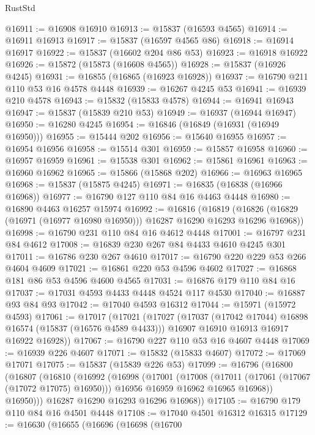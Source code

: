 \begin{lexlean}{RustStd}
\begin{coremodule}
{\begin{coremodule}
{{{{{{{{{{{{{{{{{{{{{{{{{{{{{{{{{{{{{{{{{{{{{{{{{{{{{{{{{{{{@16911 := @16908 @16910
@16913 := @15837 (@16593 @4565)
@16914 := @16911 @16913
@16917 := @15837 (@16597 @4565 @86)
@16918 := @16914 @16917
@16922 := @15837 (@16602 @204 @86 @53)
@16923 := @16918 @16922
@16926 := @15872 (@15873 (@16608 @4565))
@16928 := @15837 (@16926 @4245)
@16931 := @16855 (@16865 (@16923 @16928))
@16937 := @16790 @211 @110 @53 @16 @4578 @4448
@16939 := @16267 @4245 @53
@16941 := @16939 @210 @4578
@16943 := @15832 (@15833 @4578)
@16944 := @16941 @16943
@16947 := @15837 (@15839 @210 @53)
@16949 := @16937 (@16944 @16947)
@16950 := @16280 @4245
@16954 := @16846 (@16849 (@16931 (@16949 @16950)))
@16955 := @15444 @202
@16956 := @15640 @16955
@16957 := @16954 @16956
@16958 := @15514 @301
@16959 := @15857 @16958
@16960 := @16957 @16959
@16961 := @15538 @301
@16962 := @15861 @16961
@16963 := @16960 @16962
@16965 := @15866 (@15868 @202)
@16966 := @16963 @16965
@16968 := @15837 (@15875 @4245)
@16971 := @16835 (@16838 (@16966 @16968))
@16977 := @16790 @127 @110 @84 @16 @4463 @4448
@16980 := @16890 @4463 @16257 @15974
@16992 := @16816
    (@16819 (@16826 (@16829 (@16971 (@16977 @16980 @16950))) @16287 @16290 @16293 @16296 @16968))
@16998 := @16790 @231 @110 @84 @16 @4612 @4448
@17001 := @16797 @231 @84 @4612
@17008 := @16839 @230 @267 @84 @4433 @4610 @4245 @301
@17011 := @16786 @230 @267 @4610
@17017 := @16790 @220 @229 @53 @266 @4604 @4609
@17021 := @16861 @220 @53 @4596 @4602
@17027 := @16868 @181 @86 @53 @4596 @4600 @4565
@17031 := @16876 @179 @110 @84 @16
@17037 := @17031 @4593 @4433 @4448 @4524 @117 @4530
@17040 := @16887 @93 @84 @93
@17042 := @17040 @4593 @16312
@17044 := @15971 (@15972 @4593)
@17061 := @17017
    (@17021
      (@17027
        (@17037 (@17042 @17044) @16898 @16574 (@15837 (@16576 @4589 @4433)))
        @16907
        @16910
        @16913
        @16917
        @16922
        @16928))
@17067 := @16790 @227 @110 @53 @16 @4607 @4448
@17069 := @16939 @226 @4607
@17071 := @15832 (@15833 @4607)
@17072 := @17069 @17071
@17075 := @15837 (@15839 @226 @53)
@17099 := @16796
    (@16800
      (@16807
        (@16810
          (@16992
            (@16998
              (@17001
                (@17008
                  (@17011 (@17061 (@17067 (@17072 @17075) @16950)))
                  @16956
                  @16959
                  @16962
                  @16965
                  @16968))
              @16950)))
        @16287
        @16290
        @16293
        @16296
        @16968))
@17105 := @16790 @179 @110 @84 @16 @4501 @4448
@17108 := @17040 @4501 @16312 @16315
@17129 := @16630
    (@16655
      (@16696
        (@16698
          (@16700
}}}}}}}}}}}}}}}}}}}}}}}}}}}}}}}}}}}}}}}}}}}}}}}}}}}}}}}}}}}}
\end{coremodule}}
\end{coremodule}
\end{lexlean}
